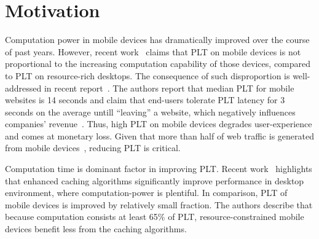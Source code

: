 \section{Motivation}
\label{sec:motivation}

Computation power in mobile devices has dramatically improved over
the course of past years. However, recent work~\cite{njait2016www}
claims that PLT on mobile devices is not proportional to the
increasing computation capability of those devices, compared to PLT on
resource-rich desktops.  The consequence of such disproportion is
well-addressed in recent report~\cite{url4}. The authors report that median
PLT for mobile websites is 14 seconds and claim that end-users
tolerate PLT latency for 3 seconds on the average untill ``leaving'' a
website, which negatively influences companies' revenue~\cite{revenue}.
Thus, high PLT on mobile devices degrades user-experience and comes at
monetary loss. Given that more than half of web traffic is generated
from mobile devices~\cite{traffic}, reducing PLT is critical.

Computation time is dominant factor in improving PLT.  Recent
work~\cite{chrome} highlights that enhanced caching algorithms
significantly improve performance in desktop environment, where
computation-power is plentiful. In comparison, PLT of mobile devices
is improved by relatively small fraction. The authors describe that
because computation consists at least 65\% of PLT,
resource-constrained mobile devices benefit less from the caching
algorithms. 

